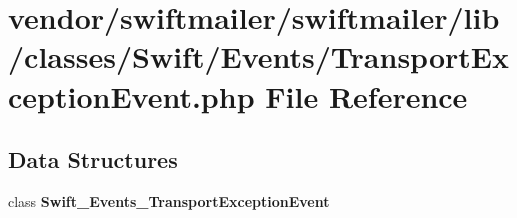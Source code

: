 \section{vendor/swiftmailer/swiftmailer/lib/classes/\+Swift/\+Events/\+Transport\+Exception\+Event.php File Reference}
\label{_transport_exception_event_8php}
\subsection*{Data Structures}
\begin{DoxyCompactItemize}
\item 
class {\bf Swift\+\_\+\+Events\+\_\+\+Transport\+Exception\+Event}
\end{DoxyCompactItemize}
